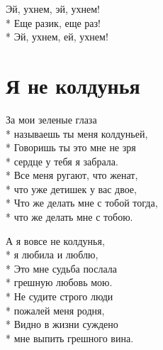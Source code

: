 \medskip

\begin{minipage}{\linewidth}
Эй, ухнем, эй, ухнем!\\*
Еще разик, еще раз!\\*
Эй, ухнем, ей, ухнем! \\
\end{minipage}

\vspace{\fill}\newpage

\section{Я не колдунья}
\label{song:Я_не_колдунья}

\medskip

\begin{minipage}{\linewidth}
За мои зеленые глаза\\*
называешь ты меня колдуньей,\\*
Говоришь ты это мне не зря\\*
сердце у тебя я забрала.\\*
Все меня ругают, что женат,\\*
что уже детишек у вас двое,\\*
Что же делать мне с тобой тогда,\\*
что же делать мне с тобою.\\
\end{minipage}\par\medskip\nobreak

\medskip

\begin{minipage}{\linewidth}
\hspace*{1.5em}А я вовсе не колдунья,\\*
\hspace*{1.5em}я любила и люблю,\\*
\hspace*{1.5em}Это мне судьба послала\\*
\hspace*{1.5em}грешную любовь мою.\\*
\hspace*{1.5em}Не судите строго люди\\*
\hspace*{1.5em}пожалей меня родня,\\*
\hspace*{1.5em}Видно в жизни суждено\\*
\hspace*{1.5em}мне выпить грешного вина.\\
\end{minipage}\par\medskip\nobreak

